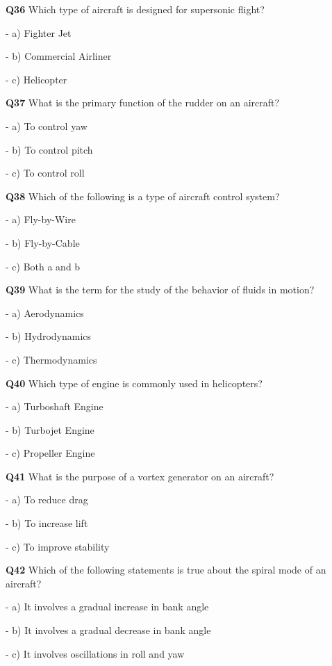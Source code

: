 \textbf{Q36} Which type of aircraft is designed for supersonic flight?\par
\quad - a) Fighter Jet\par
\quad - b) Commercial Airliner\par
\quad - c) Helicopter\par

\textbf{Q37} What is the primary function of the rudder on an aircraft?\par
\quad - a) To control yaw\par
\quad - b) To control pitch\par
\quad - c) To control roll\par

\textbf{Q38} Which of the following is a type of aircraft control system?\par
\quad - a) Fly-by-Wire\par
\quad - b) Fly-by-Cable\par
\quad - c) Both a and b\par

\textbf{Q39} What is the term for the study of the behavior of fluids in motion?\par
\quad - a) Aerodynamics\par
\quad - b) Hydrodynamics\par
\quad - c) Thermodynamics\par

\textbf{Q40} Which type of engine is commonly used in helicopters?\par
\quad - a) Turboshaft Engine\par
\quad - b) Turbojet Engine\par
\quad - c) Propeller Engine\par

\textbf{Q41} What is the purpose of a vortex generator on an aircraft?\par
\quad - a) To reduce drag\par
\quad - b) To increase lift\par
\quad - c) To improve stability\par

\textbf{Q42} Which of the following statements is true about the spiral mode of an aircraft?\par
\quad - a) It involves a gradual increase in bank angle\par
\quad - b) It involves a gradual decrease in bank angle\par
\quad - c) It involves oscillations in roll and yaw\par

